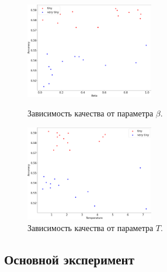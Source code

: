 \documentclass[14]{article}
\begin{document}
\begin{figure}[h]
  \begin{multicols}{2}
    \hfill
    \includegraphics[width=0.5\textwidth]{../figures/scatter_hinton_beta_acc.png}
    \hfill
    \caption{Зависимость качества от параметра $\beta$.}
    \hfill
    \includegraphics[width=0.5\textwidth]{../figures/scatter_hinton_temp_acc.png}
    \hfill
    \caption{Зависимость качества от параметра $T$.}
  \end{multicols}
\end{figure}

\subsection{Основной эксперимент}




\newpage


\end{document}
